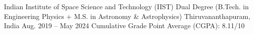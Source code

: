 
\begin{cventries}

    \cventry
    {Indian Institute of Space Science and Technology (IIST)} %
    {Dual Degree (B.Tech. in Engineering Physics + M.S. in Astronomy \& Astrophysics)} %
    {Thiruvananthapuram, India} %
    {Aug. 2019 -- May 2024} %
    {
        Cumulative Grade Point Average (CGPA): 8.11/10
    }
\end{cventries}
